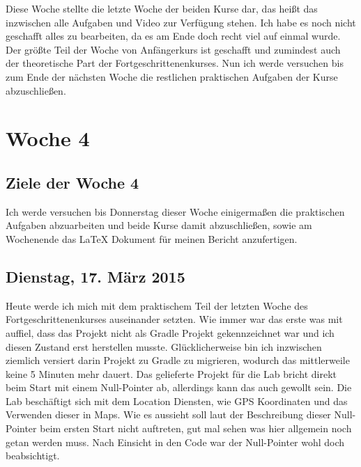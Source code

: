 \documentclass[12pt,a4paper,bibliography=totocnumbered,listof=totocnumbered]{scrartcl}
\begin{document}
Diese Woche stellte die letzte Woche der beiden Kurse dar, das heißt das inzwischen alle Aufgaben und Video zur Verfügung stehen. Ich habe es noch nicht geschafft alles zu bearbeiten, da es am Ende doch recht viel auf einmal wurde. Der größte Teil der Woche von Anfängerkurs ist geschafft und zumindest auch der theoretische Part der Fortgeschrittenenkurses. Nun ich werde versuchen bis zum Ende der nächsten Woche die restlichen praktischen Aufgaben der Kurse abzuschließen.

\pagebreak

\section{Woche 4}

\subsection{Ziele der Woche 4}

Ich werde  versuchen bis Donnerstag dieser Woche einigermaßen die praktischen Aufgaben abzuarbeiten und beide Kurse damit abzuschließen, sowie am Wochenende das LaTeX Dokument für meinen Bericht anzufertigen. 

\subsection{Dienstag, 17. März 2015}

Heute werde ich mich mit dem praktischem Teil der letzten Woche des Fortgeschrittenenkurses auseinander setzten. 
Wie immer war das erste was mit auffiel, dass das Projekt nicht als Gradle Projekt gekennzeichnet war und ich diesen Zustand erst herstellen musste. Glücklicherweise bin ich inzwischen ziemlich versiert darin Projekt zu Gradle zu migrieren, wodurch das mittlerweile keine 5 Minuten mehr dauert. 
Das gelieferte Projekt für die Lab bricht direkt beim Start mit einem Null-Pointer ab, allerdings kann das auch gewollt sein. Die Lab beschäftigt sich mit dem Location Diensten, wie GPS Koordinaten und das Verwenden dieser in Maps. Wie es aussieht soll laut der Beschreibung dieser Null-Pointer beim ersten Start nicht auftreten, gut mal sehen was hier allgemein noch getan werden muss. 
Nach Einsicht in den Code war der Null-Pointer wohl doch beabsichtigt. 
\end{document}

